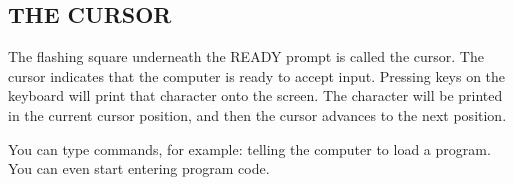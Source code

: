 \subsection{THE CURSOR}

The flashing square underneath the READY prompt is called the cursor. The cursor indicates that the computer is ready to accept input. Pressing keys on the keyboard will print that character onto the screen. The character will be printed in the current cursor position, and then the cursor advances to the next position.

You can type commands, for example: telling the computer to load a program. You can even start entering program code.
